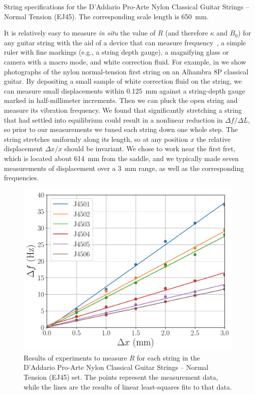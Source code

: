 \begin{table}
  \centering
  \caption{\label{tbl:ej45_mks} String specifications for the D'Addario Pro-Arte Nylon Classical Guitar Strings -- Normal Tension (EJ45). The corresponding scale length is 650~mm.}
  
\end{table}%

It is relatively easy to measure \emph{in situ} the value of $R$ (and therefore $\kappa$ and $B_0$) for any guitar string with the aid of a  device that can measure frequency~\cite{ref:pgtweb}, a simple ruler with fine markings (e.g., a string depth gauge), a magnifying glass or camera with a macro mode, and white correction fluid. For example, in  we show photographs of the nylon normal-tension first string on an Alhambra 8P classical guitar. By depositing a small sample of white correction fluid on the string, we can measure small displacements within 0.125~mm against a string-depth gauge marked in half-millimeter increments. Then we can pluck the open string and measure its vibration frequency. We found that significantly stretching a string that had settled into equilibrium could result in a nonlinear reduction in $\Delta f/\Delta L$, so prior to our measurements we tuned each string down one whole step. The string stretches uniformly along its length, so at any position $x$ the relative displacement $\Delta x/x$ should be invariant. We chose to work near the first fret, which is located about 614~mm from the saddle, and we typically made seven measurements of displacement over a 3~mm range, as well as the corresponding frequencies.

\begin{figure}
  \centering
  \includegraphics[width=5.0in]{figures/fit_ej45}
  \caption{\label{fig:fit_ej45} Results of experiments to measure $R$ for each string in the D'Addario Pro-Arte Nylon Classical Guitar Strings -- Normal Tension (EJ45) set. The points represent the measurement data, while the lines are the results of linear least-squares fits to that data.}
 \end{figure}

